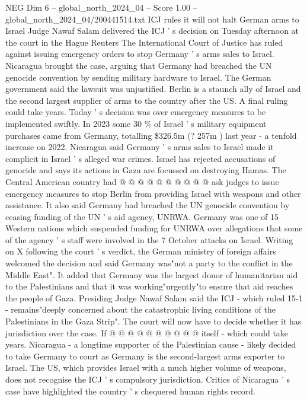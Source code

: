 \begin{textsample}{NEG Dim 6 – global\_north\_2024\_04 – Score 1.00 – global\_north\_2024\_04/200441514.txt}  \label{ex:f6_neg_370}
ICJ rules it will not halt German arms to Israel Judge Nawaf Salam delivered the ICJ ' s decision on Tuesday afternoon at the court in the Hague Reuters The International Court of Justice has ruled against issuing emergency orders to stop Germany ' s arms sales to Israel.
Nicaragua brought the case, arguing that Germany had breached the UN genocide convention by sending military hardware to Israel.
The German government said the lawsuit was unjustified.
Berlin is a staunch ally of Israel and the second largest supplier of arms to the country after the US.
A final ruling could take years.
Today ' s decision was over emergency measures to be implemented swiftly.
In 2023 some 30 \% of Israel ' s military equipment purchases came from Germany, totalling \$326.5m (? 257m ) last year - a tenfold increase on 2022.
Nicaragua said Germany ' s arms sales to Israel made it complicit in Israel ' s alleged war crimes.
Israel has rejected accusations of genocide and says its actions in Gaza are focussed on destroying Hamas.
The Central American country had @ @ @ @ @ @ @ @ @ @ ask judges to issue emergency measures to stop Berlin from providing Israel with weapons and other assistance.
It also said Germany had breached the UN genocide convention by ceasing funding of the UN ' s aid agency, UNRWA.
Germany was one of 15 Western nations which suspended funding for UNRWA over allegations that some of the agency ' s staff were involved in the 7 October attacks on Israel.
Writing on X following the court ' s verdict, the German ministry of foreign affairs welcomed the decision and said Germany was"not a party to the conflict in the Middle East".
It added that Germany was the largest donor of humanitarian aid to the Palestinians and that it was working"urgently"to ensure that aid reaches the people of Gaza.
Presiding Judge Nawaf Salam said the ICJ - which ruled 15-1 - remains"deeply concerned about the catastrophic living conditions of the Palestinians in the Gaza Strip".
The court will now have to decide whether it has jurisdiction over the case.
If @ @ @ @ @ @ @ @ @ @ itself - which could take years.
Nicaragua - a longtime supporter of the Palestinian cause - likely decided to take Germany to court as Germany is the second-largest arms exporter to Israel.
The US, which provides Israel with a much higher volume of weapons, does not recognise the ICJ ' s compulsory jurisdiction.
Critics of Nicaragua ' s case have highlighted the country ' s chequered human rights record.

\end{textsample}
